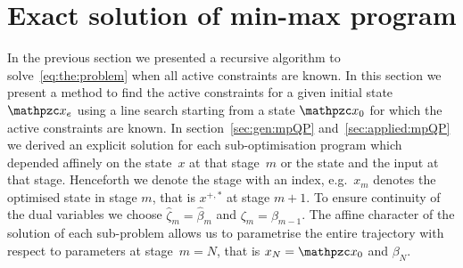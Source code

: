 \documentclass{ifacconf}
\begin{document}
\section{Exact solution of min-max program}\label{sec:line:search}
In the previous section we presented a recursive algorithm to solve~\eqref{eq:the:problem}
when all active constraints are known. In this section we present a method to find the active
constraints for a given initial state $\mathpzc x_e$ using a line search starting from a state $\mathpzc x_0$
for which the active constraints are known. In section~\ref{sec:gen:mpQP} and~\ref{sec:applied:mpQP}
we derived an explicit solution for each sub-optimisation program which depended affinely on the
state~$x$ at that stage~$m$ or the state and the input at that stage. Henceforth we denote the stage 
with an index, e.g.~$x_m$ denotes the optimised state in stage $m$, that is $x^{+,\ast}$ at stage $m+1$.
To ensure continuity of the dual variables we choose $\hat\zeta_m = \hat\beta_m$ and $\zeta_m=\beta_{m-1}$.
The affine character of the solution of each sub-problem allows us to parametrise the entire trajectory
with respect to parameters at stage~$m=N$, that is $x_N=\mathpzc x_0$ and $\beta_N$.
\end{document}

